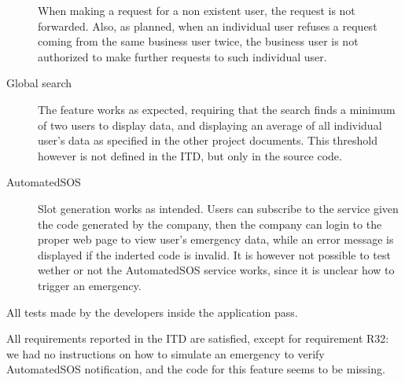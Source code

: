 \documentclass[../main.tex]{subfiles}
\begin{document}
\begin{description}
        When making a request for a non existent user, the request is not forwarded. Also, as planned, when an individual user refuses a request coming from the same business user twice, the business user is not authorized to make further requests to such individual user.
        \item [Global search] The feature works as expected, requiring that the search finds a minimum of two users to display data, and displaying an average of all individual user's data as specified in the other project documents. This threshold however is not defined in the ITD, but only in the source code.
        \item [AutomatedSOS] Slot generation works as intended. Users can subscribe to the service given the code generated by the company, then the company can login to the proper web page to view user's emergency data, while an error message is displayed if the inderted code is invalid. It is however not possible to test wether or not the AutomatedSOS service works, since it is unclear how to trigger an emergency.
    \end{description}

    All tests made by the developers inside the application pass.

    All requirements reported in the ITD are satisfied, except for requirement R32: we had no instructions on how to simulate an emergency to verify AutomatedSOS notification, and the code for this feature seems to be missing.
    
    
\end{document}
